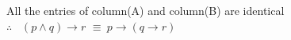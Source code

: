 \documentclass[17pt]{extarticle}
\begin{document}
\begin{fleqn}
\begin{tabular}{|c|*{7}{c|}}
\end{tabular} \\ \\
All the entries of column(A) and column(B) are identical \\
$\therefore$ \ $(p \wedge q) \to r$ $ \equiv \ p \to (q \to r)$ 


\begin{equation} \nonumber
\end{equation}





\end{fleqn}
\end{document}
